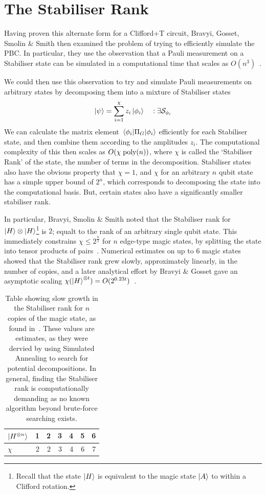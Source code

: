 \documentclass{standalone}
\begin{document}
\section{The Stabiliser Rank}\label{sec:srank}
Having proven this alternate form for a Clifford+T circuit, Bravyi, Gosset, Smolin \& Smith then examined the problem of trying to efficiently simulate the PBC. In particular, they use the observation that a Pauli measurement on a Stabiliser state can be simulated in a computational time that scales as $O(n^{3})$~\cite{Aaronson2004a,Bravyi2015}. 
\par
We could then use this observation to try and simulate Pauli measurements on arbitrary states by decomposing them into a mixture of Stabiliser states 
\begin{equation}
\ket{\psi} = \sum_{i=1}^{\chi}z_{i}\ket{\phi_{i}}\quad:\exists\mathcal{S}_{\phi_i}
\end{equation}
We can calculate the matrix element $\matrixel{\phi_{i}}{\Pi_{G}}{\phi_{i}}$ efficiently for each Stabiliser state, and then combine them according to the amplitudes $z_{i}$. The computational complexity of this then scales as $O(\chi\;\text{poly}(n))$, where $\chi$ is called the `Stabiliser Rank' of the state, the number of terms in the decomposition. Stabiliser states also have the obvious property that $\chi=1$, and $\chi$ for an arbitrary $n$ qubit state has a simple upper bound of $2^{n}$, which corresponds to decomposing the state into the computational basis. But, certain states also have a significantly smaller stabiliser rank.
\par
In particular, Bravyi, Smolin \& Smith noted that the Stabiliser rank for $\ket{H}\otimes\ket{H}$\footnote{Recall that the state $\ket{H}$ is equivalent to the magic state $\ket{A}$ to within a Clifford rotation.} is $2$; equalt to the rank of an arbitrary single qubit state. This immediately constrains $\chi\leq 2^{\frac{n}{2}}$ for $n$ edge-type magic states, by splitting the state into tensor products of pairs~\cite{Bravyi2015}. Numerical estimates on up to 6 magic states showed that the Stabiliser rank grew slowly, approximately linearly, in the number of copies, and a later analytical effort by Bravyi \& Gosset gave an asymptotic scaling $\chi(\ket{H}^{\otimes t})=O(2^{0.23 t})$~\cite{Bravyi2016b}.
\par
\begin{table}[h]
\centering
\begin{tabular}{||l|r|r|r|r|r|r||}
\hline
$\ket{H^{\otimes n}}$ & 1 & 2 & 3 & 4 & 5 & 6 \\ \hline
$\chi$ & 2 & 2 & 3 & 4 & 6 & 7\\ \hline
\end{tabular}
\caption{Table showing slow growth in the Stabiliser rank for $n$ copies of the magic state, as found in~\cite{Bravyi2015}. These values are estimates, as they were dervied by using Simulated Annealing to search for potential decompositions. In general, finding the Stabiliser rank is computationally demanding as no known algorithm beyond brute-force searching exists.}
\label{tab:approxchi}
\end{table}
\end{document}
